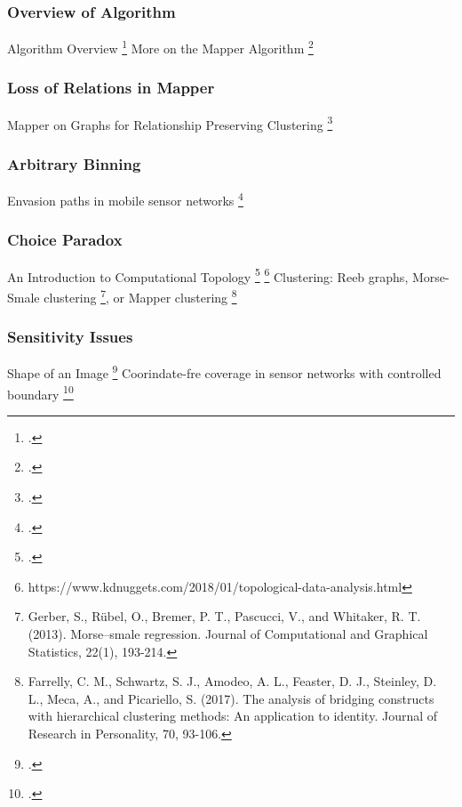 \subsubsection{Overview of Algorithm}
Algorithm Overview  \footcite{Muller}
More on the Mapper Algorithm \footcite{Stovner}
\subsubsection{Loss of Relations in Mapper}
Mapper on Graphs for Relationship Preserving Clustering \footcite{MOG}
\subsubsection{Arbitrary Binning}
Envasion paths in mobile sensor networks \footcite{Carlsson2015}
\subsubsection{Choice Paradox}
An Introduction to Computational Topology \footcite{Adams}
\footnote{https://www.kdnuggets.com/2018/01/topological-data-analysis.html}
Clustering: Reeb graphs, Morse-Smale clustering \footnote{Gerber, S., Rübel, O., Bremer, P. T., Pascucci, V., and  Whitaker, R. T. (2013). Morse–smale regression. Journal of Computational and Graphical Statistics, 22(1), 193-214.}, or Mapper clustering
\footnote{Farrelly, C. M., Schwartz, S. J., Amodeo, A. L., Feaster, D. J., Steinley, D. L., Meca, A., and Picariello, S. (2017). The analysis of bridging constructs with hierarchical clustering methods: An application to identity. Journal of Research in Personality, 70, 93-106.}

\subsubsection{Sensitivity Issues}
Shape of an Image \footcite{Rosen2017}
Coorindate-fre coverage in sensor networks with controlled boundary \footcite{Ghrist2006}

